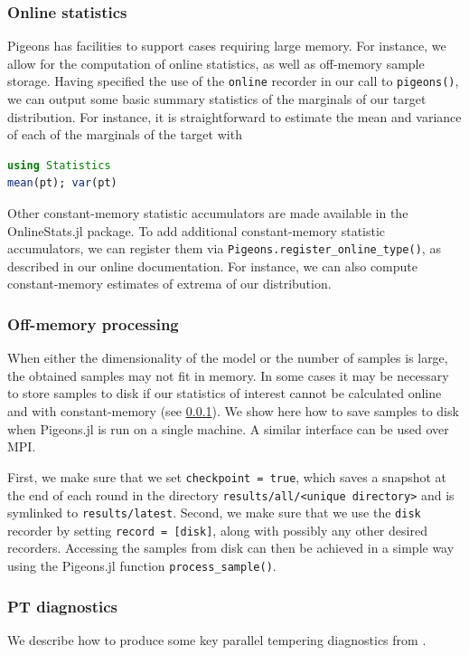 \subsubsection{Online statistics}
\label{sec:online_stats}
Pigeons has facilities to support cases requiring large memory. For instance, we
allow for the computation of online statistics, as well as off-memory sample storage.
Having specified the use of the \texttt{online} recorder in our call to \texttt{pigeons()}, 
we can output some basic summary statistics of the marginals of our target distribution. 
For instance, it is straightforward to estimate the mean and variance of each 
of the marginals of the target with 
\begin{lstlisting}[language=Julia]
using Statistics
mean(pt); var(pt)
\end{lstlisting}
Other constant-memory statistic accumulators are made available in the 
OnlineStats.jl \cite{day2020onlinestats} package. 
To add additional constant-memory statistic accumulators, we 
can register them via \texttt{Pigeons.register\_online\_type()}, as described in our 
online documentation. 
For instance, we can also compute constant-memory estimates 
of extrema of our distribution.


\subsubsection{Off-memory processing}
When either the dimensionality of the model or the number of samples is large,
the obtained samples may not fit in memory. 
In some cases it may be necessary to store samples to disk if our statistics of 
interest cannot be calculated online and with constant-memory
(see \cref{sec:online_stats}).
We show here how to save samples to disk when Pigeons.jl is run on a single 
machine. A similar interface can be used over MPI. 

 
First, we make sure that we set \texttt{checkpoint = true}, which saves a 
snapshot at the end of each round in the directory \texttt{results/all/<unique directory>}
and is symlinked to \texttt{results/latest}.
Second, we make sure that we use the \texttt{disk} recorder 
by setting \texttt{record = [disk]}, along with possibly any other desired recorders.
Accessing the samples from disk can then be achieved in a simple way using the Pigeons.jl 
function \texttt{process\_sample()}.


\subsubsection{PT diagnostics}
\label{sec:PT_diagnostics}
We describe how to produce some key parallel tempering diagnostics from 
\citet{syed2021nrpt}.

